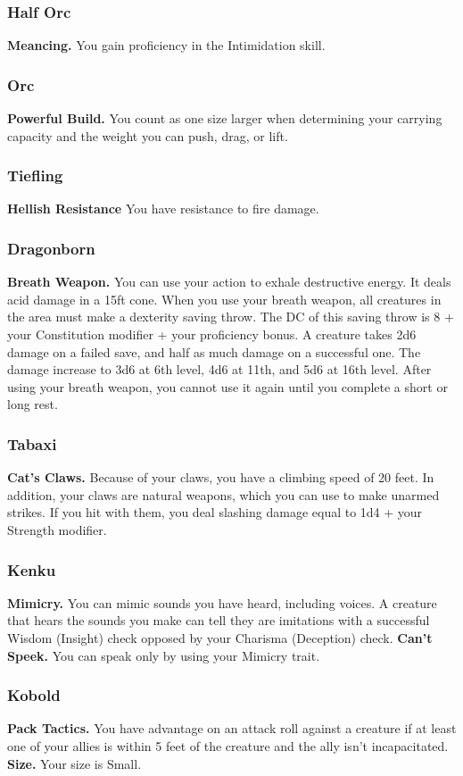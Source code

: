 \documentclass[a4paper,10pt,twoside,twocolumn]{dndbook} %
\begin{document}
	\subsubsection{Half Orc}
	\textbf{Meancing.} You gain proficiency in the Intimidation skill.
	\subsubsection{Orc}
	\textbf{Powerful Build.} You count as one size larger when determining your carrying capacity and the weight you can push, drag, or lift.
	\subsubsection{Tiefling}
	\textbf{Hellish Resistance} You have resistance to fire damage.
	\subsubsection{Dragonborn}
	\textbf{Breath Weapon.} You can use your action to exhale destructive energy. It deals acid damage in a 15ft cone. When you use your breath weapon, all creatures in the area must make a dexterity saving throw. The DC of this saving throw is 8 + your Constitution modifier + your proficiency bonus. A creature takes 2d6 damage on a failed save, and half as much damage on a successful one. The damage increase to 3d6 at 6th level, 4d6 at 11th, and 5d6 at 16th level. After using your breath weapon, you cannot use it again until you complete a short or long rest.
	\subsubsection{Tabaxi}
	\textbf{Cat's Claws.} Because of your claws, you have a climbing speed of 20 feet. In addition, your claws are natural weapons, which you can use to make unarmed strikes. If you hit with them, you deal slashing damage equal to 1d4 + your Strength modifier.
	\subsubsection{Kenku}
	\textbf{Mimicry.} You can mimic sounds you have heard, including voices. A creature that hears the sounds you make can tell they are imitations with a successful Wisdom (Insight) check opposed by your Charisma (Deception) check.\linebreak
	\textbf{Can't Speek.} You can speak only by using your Mimicry trait.
	\subsubsection{Kobold}
	\textbf{Pack Tactics.} You have advantage on an attack roll against a creature if at least one of your allies is within 5 feet of the creature and the ally isn't incapacitated.\linebreak
	\textbf{Size.} Your size is Small.
\end{document}
